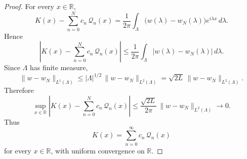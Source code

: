 \documentclass[12pt]{article}
\begin{document}
\begin{proof}
For every $x\in\mathbb{R}$,
\[
    K(x)-\sum_{n=0}^N c_n\,\mathcal{Q}_n(x)
    =
    \frac{1}{2\pi}\int_{\Lambda} \bigl(w(\lambda)-w_N(\lambda)\bigr)e^{i\lambda x}\,d\lambda .
\]
Hence
\[
    \left|K(x)-\sum_{n=0}^N c_n\,\mathcal{Q}_n(x)\right|
    \le
    \frac{1}{2\pi}\int_{\Lambda} |w(\lambda)-w_N(\lambda)|\,d\lambda .
\]
Since $\Lambda$ has finite measure,
\[
    \|w-w_N\|_{L^1(\Lambda)}
    \le
    |\Lambda|^{1/2}\,\|w-w_N\|_{L^2(\Lambda)}
    =
    \sqrt{2L}\,\|w-w_N\|_{L^2(\Lambda)} .
\]
Therefore
\[
    \sup_{x\in\mathbb{R}}
    \left|K(x)-\sum_{n=0}^N c_n\,\mathcal{Q}_n(x)\right|
    \le
    \frac{\sqrt{2L}}{2\pi}\,\|w-w_N\|_{L^2(\Lambda)} \longrightarrow 0 .
\]
Thus
\[
    K(x)=\sum_{n=0}^\infty c_n\,\mathcal{Q}_n(x)
\]
for every $x\in\mathbb{R}$, with uniform convergence on $\mathbb{R}$.
\end{proof}

\bigskip
\end{document}
